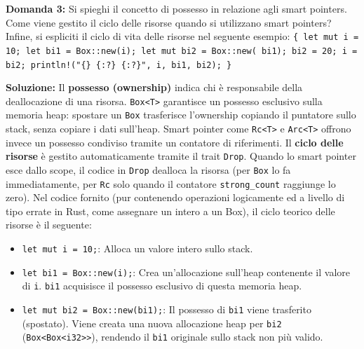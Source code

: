 \begin{exambox}
\textbf{Domanda 3:} Si spieghi il concetto di possesso in relazione agli smart pointers. Come viene gestito il ciclo delle risorse quando si utilizzano smart pointers?
Infine, si espliciti il ciclo di vita delle risorse nel seguente esempio:
\texttt{\{ let mut i = 10; let bi1 = Box::new(i); let mut bi2 = Box::new( bi1); bi2 = 20; i = bi2; println!("\{\} \{:?\} \{:?\}", i, bi1, bi2); \}}
\end{exambox}
\textbf{Soluzione:}
Il \textbf{possesso (ownership)} indica chi è responsabile della deallocazione di una risorsa. \texttt{Box<T>} garantisce un possesso esclusivo sulla memoria heap: spostare un \texttt{Box} trasferisce l'ownership copiando il puntatore sullo stack, senza copiare i dati sull'heap. Smart pointer come \texttt{Rc<T>} e \texttt{Arc<T>} offrono invece un possesso condiviso tramite un contatore di riferimenti.
Il \textbf{ciclo delle risorse} è gestito automaticamente tramite il trait \texttt{Drop}. Quando lo smart pointer esce dallo scope, il codice in \texttt{Drop} dealloca la risorsa (per \texttt{Box} lo fa immediatamente, per \texttt{Rc} solo quando il contatore \texttt{strong\_count} raggiunge lo zero).
Nel codice fornito (pur contenendo operazioni logicamente ed a livello di tipo errate in Rust, come assegnare un intero a un Box), il ciclo teorico delle risorse è il seguente:
\begin{itemize}
    \item \texttt{let mut i = 10;}: Alloca un valore intero sullo stack.
    \item \texttt{let bi1 = Box::new(i);}: Crea un'allocazione sull'heap contenente il valore di \texttt{i}. \texttt{bi1} acquisisce il possesso esclusivo di questa memoria heap.
    \item \texttt{let mut bi2 = Box::new(bi1);}: Il possesso di \texttt{bi1} viene trasferito (spostato). Viene creata una nuova allocazione heap per \texttt{bi2} (\texttt{Box<Box<i32>>}), rendendo il \texttt{bi1} originale sullo stack non più valido.
\end{itemize}

